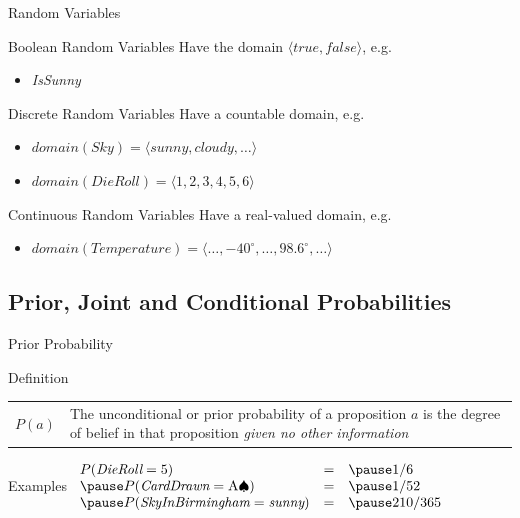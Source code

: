 \documentclass[14pt]{beamer}
\begin{document}
\begin{frame}{Random Variables}
	\begin{block}{Boolean Random Variables}
		Have the domain $\langle \textit{true}, \textit{false} \rangle$, e.g.
		\begin{itemize}
			\item \textit{IsSunny}
		\end{itemize}
	\end{block}
	\pause
	\begin{block}{Discrete Random Variables}
		Have a countable domain, e.g.
		\begin{itemize}
			\item $\textit{domain}(\textit{Sky}) =
			       \langle \textit{sunny}, \textit{cloudy}, \ldots \rangle$
			\item $\textit{domain}(\textit{DieRoll}) =
			       \langle 1, 2, 3, 4, 5, 6 \rangle$
		\end{itemize}
	\end{block}
	\pause
	\begin{block}{Continuous Random Variables}
		Have a real-valued domain, e.g.
		\begin{itemize}
			\item $\textit{domain}(\textit{Temperature}) =
			       \langle \ldots, -40^{\circ}, \ldots, 98.6^{\circ}, \ldots \rangle$
		\end{itemize}
	\end{block}
\end{frame}


\subsection{Prior, Joint and Conditional Probabilities}
\begin{frame}{Prior Probability}
\begin{block}{Definition}
\begin{tabular}{lm{3.5in}}
\large $P(a)$
&
The \alert{unconditional} or \alert{prior probability} of a proposition $a$ is the degree of belief in that proposition \emph{given no other information}
\end{tabular}
\end{block}
\pause
\begin{block}{Examples}
$
\begin{array}{lll}
P(\textit{DieRoll} = 5) & = & \pause 1/6 \\
\pause
P(\textit{CardDrawn} = \mbox{A}\spadesuit) & = & \pause 1/52 \\
\pause
P(\textit{SkyInBirmingham} = \textit{sunny}) & = & \pause 210/365
\end{array}
$
\end{block}
\end{frame}
\end{document}
